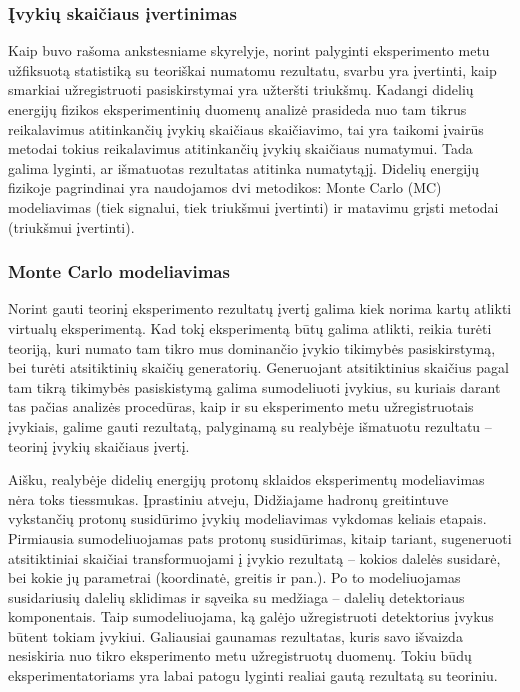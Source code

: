\documentclass[a4paper, 12pt]{article}
\begin{document}
\subsubsection{Įvykių skaičiaus įvertinimas}

Kaip buvo rašoma ankstesniame skyrelyje, norint palyginti eksperimento metu užfiksuotą
statistiką su teoriškai numatomu rezultatu, svarbu yra įvertinti, kaip smarkiai užregistruoti
pasiskirstymai yra užteršti triukšmų.
Kadangi didelių energijų fizikos eksperimentinių duomenų analizė prasideda nuo tam tikrus
reikalavimus atitinkančių įvykių skaičiaus skaičiavimo, tai yra taikomi įvairūs metodai
tokius reikalavimus atitinkančių įvykių skaičiaus numatymui.
Tada galima lyginti, ar išmatuotas rezultatas atitinka numatytąjį.
Didelių energijų fizikoje pagrindinai yra naudojamos dvi metodikos: Monte Carlo (MC) modeliavimas
(tiek signalui, tiek triukšmui įvertinti) ir matavimu grįsti metodai (triukšmui įvertinti).

\subsubsection*{Monte Carlo modeliavimas}

Norint gauti teorinį eksperimento rezultatų įvertį galima kiek norima kartų atlikti virtualų
eksperimentą.
Kad tokį eksperimentą būtų galima atlikti, reikia turėti teoriją, kuri numato tam tikro mus
dominančio įvykio tikimybės pasiskirstymą, bei turėti atsitiktinių skaičių generatorių.
Generuojant atsitiktinius skaičius pagal tam tikrą tikimybės pasiskistymą galima sumodeliuoti
įvykius, su kuriais darant tas pačias analizės procedūras, kaip ir su eksperimento metu
užregistruotais įvykiais, galime gauti rezultatą, palyginamą su realybėje išmatuotu
rezultatu -- teorinį įvykių skaičiaus įvertį.

Aišku, realybėje didelių energijų protonų sklaidos eksperimentų modeliavimas nėra toks
tiessmukas.
Įprastiniu atveju, Didžiajame hadronų greitintuve vykstančių protonų susidūrimo įvykių
modeliavimas vykdomas keliais etapais.
Pirmiausia sumodeliuojamas pats protonų susidūrimas, kitaip tariant, sugeneruoti
atsitiktiniai skaičiai transformuojami į įvykio rezultatą -- kokios dalelės susidarė, bei
kokie jų parametrai (koordinatė, greitis ir pan.).
Po to modeliuojamas susidariusių dalelių sklidimas ir sąveika su medžiaga -- dalelių
detektoriaus komponentais.
Taip sumodeliuojama, ką galėjo užregistruoti detektorius įvykus būtent tokiam įvykiui.
Galiausiai gaunamas rezultatas, kuris savo išvaizda nesiskiria nuo tikro eksperimento metu
užregistruotų duomenų.
Tokiu būdų eksperimentatoriams yra labai patogu lyginti realiai gautą rezultatą su teoriniu.
\end{document}
